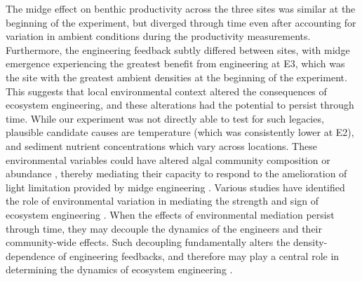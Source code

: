 The midge effect on benthic productivity across the three sites 
was similar at the beginning of the experiment,
but diverged through time even after accounting for variation in ambient conditions
during the productivity measurements.
Furthermore, the engineering feedback subtly differed between sites,
with midge emergence experiencing the greatest benefit from engineering at E3,
which was the site with the greatest ambient densities at the beginning of the experiment.
This suggests that local environmental context altered the consequences 
of ecosystem engineering, 
and these alterations had the potential to persist through time.
While our experiment was not directly able to test for such legacies,
plausible candidate causes are temperature (which was consistently lower at E2),
and sediment nutrient concentrations which vary across locations.
These environmental variables could have altered algal 
community composition or abundance
\citep{gudmundsdottir2011, mccormick2019},
thereby mediating their capacity to respond to the 
amelioration of light limitation provided by midge engineering
\citep{phillips2019}.
Various studies have identified the role of environmental variation in mediating 
the strength and sign of ecosystem engineering 
\citep{wright2006,lathlean2017}.
When the effects of environmental mediation persist through time,
they may decouple the dynamics of the engineers and their community-wide effects.
Such decoupling fundamentally alters the density-dependence of engineering feedbacks,
and therefore may play a central role in determining the dynamics of ecosystem engineering
\citep{cuddington2009}.
